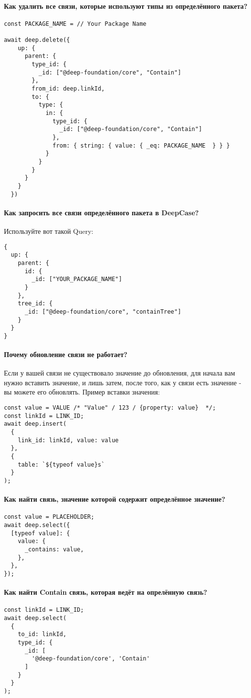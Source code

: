 \paragraph{Как удалить все связи, которые используют типы из определённого пакета?}
\begin{verbatim}
const PACKAGE_NAME = // Your Package Name

await deep.delete({
    up: {
      parent: {
        type_id: {
          _id: ["@deep-foundation/core", "Contain"]
        },
        from_id: deep.linkId,
        to: {
          type: {
            in: {
              type_id: {
                _id: ["@deep-foundation/core", "Contain"]
              },
              from: { string: { value: { _eq: PACKAGE_NAME  } } }
            }
          }
        }
      }
    }
  })
\end{verbatim}
\paragraph{Как запросить все связи определённого пакета в DeepCase?}
Используйте вот такой Query:
\begin{verbatim}
{
  up: {
    parent: {
      id: {
        _id: ["YOUR_PACKAGE_NAME"]
      }
    },
    tree_id: {
      _id: ["@deep-foundation/core", "containTree"]
    }
  }
}
\end{verbatim}
\paragraph{Почему обновление связи не работает?}
Если у вашей связи не существовало значение до обновления, для начала вам нужно вставить значение, и лишь затем, после того, как у связи есть значение - вы можете его обновлять.
Пример вставки значения:
\begin{verbatim}
const value = VALUE /* "Value" / 123 / {property: value}  */;
const linkId = LINK_ID;
await deep.insert(
  {
    link_id: linkId, value: value 
  },
  {
    table: `${typeof value}s`
  }
);
\end{verbatim}
\paragraph{Как найти связь, значение которой содержит определённое значение?}
\begin{verbatim}
const value = PLACEHOLDER;
await deep.select({
  [typeof value]: {
    value: {
      _contains: value,
    },
  },
});
\end{verbatim}
\paragraph{Как найти Contain связь, которая ведёт на опрелённую связь?}
\begin{verbatim}
const linkId = LINK_ID;
await deep.select(
  {
    to_id: linkId,
    type_id: {
      _id: [
        '@deep-foundation/core', 'Contain'
      ]
    }
  }
);
\end{verbatim}